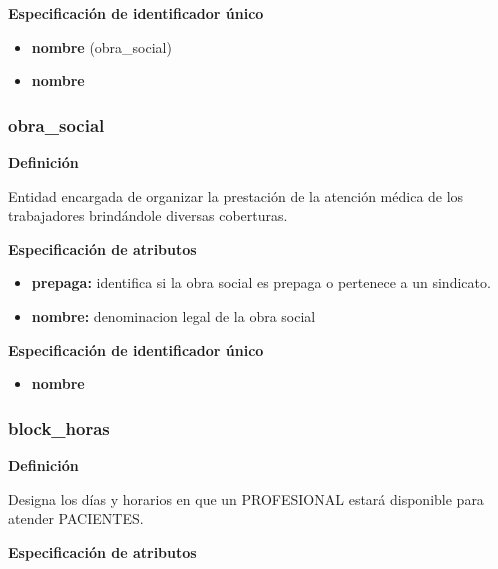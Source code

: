 \documentclass[a4paper,11pt]{article}
\begin{document}
\textbf{Especificación de identificador único}

\begin{itemize}

     \item \textbf{nombre} (obra\_social)

     \item \textbf{nombre}

\end{itemize}

\subsubsection{\textbf{obra\_social}}

\textbf{Definición}

Entidad encargada de organizar la prestación de la atención médica de los 
trabajadores brindándole diversas coberturas.

\textbf{Especificación de atributos}

\begin{itemize}

     \item \textbf{prepaga:} identifica si la obra social es prepaga o pertenece a un sindicato.

     \item \textbf{nombre:} denominacion legal de la obra social

\end{itemize}

\textbf{Especificación de identificador único}

\begin{itemize}

     \item \textbf{nombre}

\end{itemize}

\subsubsection{\textbf{block\_horas}}

\textbf{Definición}

Designa los días y horarios en que un PROFESIONAL estará disponible para atender 
PACIENTES.

\textbf{Especificación de atributos}
\end{document}
